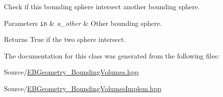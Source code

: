 Check if this bounding sphere intersect another bounding sphere. 


\begin{DoxyParams}[1]{Parameters}
\mbox{\tt in}  & {\em a\+\_\+other} & Other bounding sphere. \\
\hline
\end{DoxyParams}
\begin{DoxyReturn}{Returns}
True if the two sphere intersect. 
\end{DoxyReturn}


The documentation for this class was generated from the following files\+:\begin{DoxyCompactItemize}
\item 
Source/\hyperlink{EBGeometry__BoundingVolumes_8hpp}{E\+B\+Geometry\+\_\+\+Bounding\+Volumes.\+hpp}\item 
Source/\hyperlink{EBGeometry__BoundingVolumesImplem_8hpp}{E\+B\+Geometry\+\_\+\+Bounding\+Volumes\+Implem.\+hpp}\end{DoxyCompactItemize}

